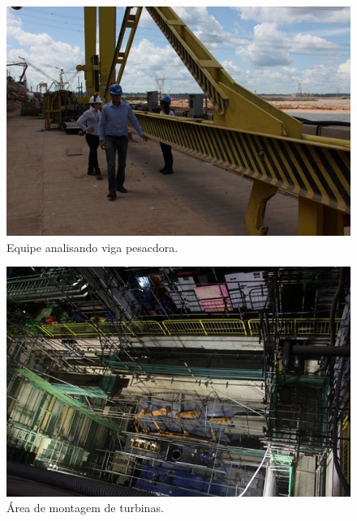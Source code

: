 \begin{figure}[h!]
  \centering
  \includegraphics[width=1\linewidth]{Fotos/Novembro2013/3.jpg}
  \caption{Equipe analisando viga pesacdora.}
  \label{nov20133}
\end{figure}

\begin{figure}[h!]
  \centering
  \includegraphics[width=1\linewidth]{Fotos/Novembro2013/4.jpg}
  \caption{Área de montagem de turbinas.}
  \label{nov20134}
\end{figure}